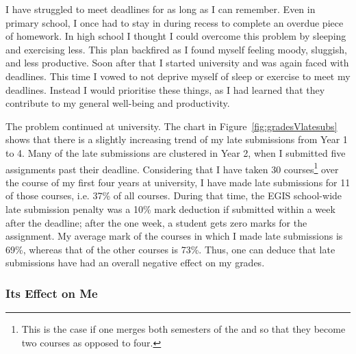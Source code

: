 I have struggled to meet deadlines for as long as I can remember.
Even in primary school, I once had to stay in during recess to complete an overdue piece of homework.
In high school I thought I could overcome this problem by sleeping and exercising less.
This plan backfired as I found myself feeling moody, sluggish, and less productive.
Soon after that I started university and was again faced with deadlines.
This time I vowed to not deprive myself of sleep or exercise to meet my deadlines.
Instead I would prioritise these things, as I had learned that they contribute to my general well-being and productivity.

The problem continued at university.
The chart in Figure~\ref{fig:gradesVlatesubs} shows that there is a slightly increasing trend of my late submissions from Year 1 to 4.
Many of the late submissions are clustered in Year 2, when I submitted five assignments past their deadline.
Considering that I have taken 30 courses\footnote{This is the case if one merges both semesters of the \PRJTitle \space and \DSTTitle \space so that they become two courses as opposed to four.} 
over the course of my first four years at university, I have made late submissions for 11 of those courses, i.e. 37\% of all courses.
During that time, the EGIS school-wide late submission penalty was a 10\% mark deduction if submitted within a week after the deadline; after the one week, a student gets zero marks for the assignment.
My average mark of the courses in which I made late submissions is 69\%, whereas that of the other courses is 73\%.
Thus, one can deduce that late submissions have had an overall negative effect on my grades.




\subsubsection*{Its Effect on Me}

